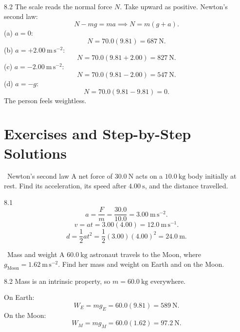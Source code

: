 \begin{solution}{8.2}
The scale reads the normal force $N$. Take upward as positive. Newton's second
law:
\[
N-mg=ma
\implies
N=m(g+a).
\]
(a) $a=0$:
\[
N=70.0(9.81)=687\ \mathrm{N}.
\]
(b) $a=+2.00\ \mathrm{m\,s^{-2}}$:
\[
N=70.0(9.81+2.00)=827\ \mathrm{N}.
\]
(c) $a=-2.00\ \mathrm{m\,s^{-2}}$:
\[
N=70.0(9.81-2.00)=547\ \mathrm{N}.
\]
(d) $a=-g$:
\[
N=70.0(9.81-9.81)=0.
\]
The person feels weightless.
\end{solution}

\section{Exercises and Step-by-Step Solutions}

\begin{exercise}{\warm\ Newton's second law}
A net force of $30.0\ \mathrm{N}$ acts on a $10.0\ \mathrm{kg}$ body initially at
rest. Find its acceleration, its speed after $4.00\ \mathrm{s}$, and the distance
travelled.
\end{exercise}

\begin{tabletworkspace}[6.5cm]
\end{tabletworkspace}

\begin{solution}{8.1}
\[
a=\frac Fm=\frac{30.0}{10.0}=3.00\ \mathrm{m\,s^{-2}}.
\]
\[
v=at=3.00(4.00)=12.0\ \mathrm{m\,s^{-1}}.
\]
\[
d=\frac12at^2=\frac12(3.00)(4.00)^2=24.0\ \mathrm{m}.
\]
\end{solution}

\begin{exercise}{\warm\ Mass and weight}
A $60.0\ \mathrm{kg}$ astronaut travels to the Moon, where
$g_{\text{Moon}}=1.62\ \mathrm{m\,s^{-2}}$. Find her mass and weight on Earth and
on the Moon.
\end{exercise}

\begin{tabletworkspace}[6.5cm]
\end{tabletworkspace}

\begin{solution}{8.2}
Mass is an intrinsic property, so $m=60.0\ \mathrm{kg}$ everywhere.

On Earth:
\[
W_E=mg_E=60.0(9.81)=589\ \mathrm{N}.
\]
On the Moon:
\[
W_M=mg_M=60.0(1.62)=97.2\ \mathrm{N}.
\]
\end{solution}


